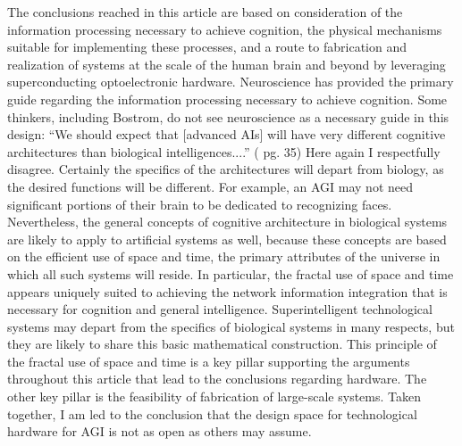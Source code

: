 The conclusions reached in this article are based on consideration of the information processing necessary to achieve cognition, the physical mechanisms suitable for implementing these processes, and a route to fabrication and realization of systems at the scale of the human brain and beyond by leveraging superconducting optoelectronic hardware. Neuroscience has provided the primary guide regarding the information processing necessary to achieve cognition. Some thinkers, including Bostrom, do not see neuroscience as a necessary guide in this design: ``We should expect that [advanced AIs] will have very different cognitive architectures than biological intelligences....'' (\cite{bo2014} pg. 35) Here again I respectfully disagree. Certainly the specifics of the architectures will depart from biology, as the desired functions will be different. For example, an AGI may not need significant portions of their brain to be dedicated to recognizing faces. Nevertheless, the general concepts of cognitive architecture in biological systems are likely to apply to artificial systems as well, because these concepts are based on the efficient use of space and time, the primary attributes of the universe in which all such systems will reside. In particular, the fractal use of space and time appears uniquely suited to achieving the network information integration that is necessary for cognition and general intelligence. Superintelligent technological systems may depart from the specifics of biological systems in many respects, but they are likely to share this basic mathematical construction. This principle of the fractal use of space and time is a key pillar supporting the arguments throughout this article that lead to the conclusions regarding hardware. The other key pillar is the feasibility of fabrication of large-scale systems. Taken together, I am led to the conclusion that the design space for technological hardware for AGI is not as open as others may assume.

